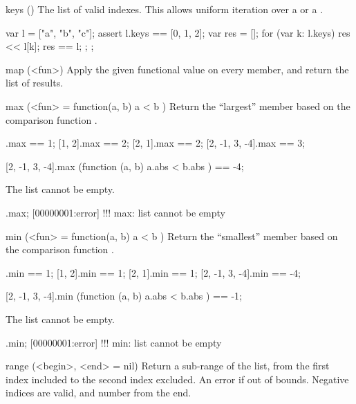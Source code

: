\begin{urbiscriptapi}
\item[keys]()
  The list of valid indexes.  This allows uniform iteration over a
   or a .

\begin{urbiscript}
{
  var l = ["a", "b", "c"];
  assert
  {
    l.keys == [0, 1, 2];
    {
      var res = [];
      for (var k: l.keys)
        res << l[k];
      res
    }
    == l;
  };
};
\end{urbiscript}

\item[map](<fun>)
Apply the given functional value on every member, and return the list
of results.


\item[max](<fun> = function(a, b) { a < b })
  Return the ``largest'' member based on the comparison function .
\begin{urbiassert}
           [1].max == 1;
        [1, 2].max == 2;
        [2, 1].max == 2;
[2, -1, 3, -4].max == 3;

[2, -1, 3, -4].max (function (a, b) { a.abs < b.abs }) == -4;
\end{urbiassert}

The list cannot be empty.

\begin{urbiscript}
[].max;
[00000001:error] !!! max: list cannot be empty
\end{urbiscript}

\item[min](<fun> = function(a, b) { a < b })
  Return the ``smallest'' member based on the comparison function .
\begin{urbiassert}
           [1].min == 1;
        [1, 2].min == 1;
        [2, 1].min == 1;
[2, -1, 3, -4].min == -4;

[2, -1, 3, -4].min (function (a, b) { a.abs < b.abs }) == -1;
\end{urbiassert}

The list cannot be empty.

\begin{urbiscript}
[].min;
[00000001:error] !!! min: list cannot be empty
\end{urbiscript}

\item[range](<begin>, <end> = nil)
  Return a sub-range of the list, from the first index included to the
  second index excluded.  An error if out of bounds.  Negative indices
  are valid, and number from the end.


\end{urbiscriptapi}
